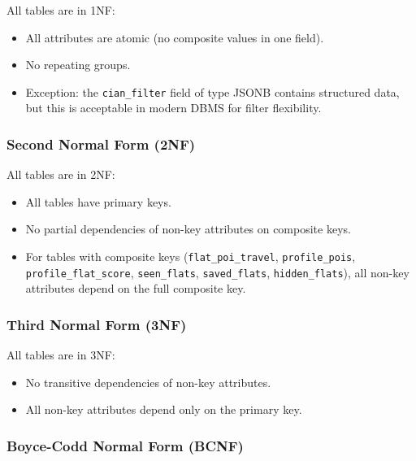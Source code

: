 \documentclass[12pt,a4paper]{article}
\begin{document}
All tables are in 1NF:
\begin{itemize}
    \item All attributes are atomic (no composite values in one field).
    \item No repeating groups.
    \item Exception: the \texttt{cian\_filter} field of type JSONB contains structured data, but this is acceptable in modern DBMS for filter flexibility.
\end{itemize}

\subsubsection{Second Normal Form (2NF)}

All tables are in 2NF:
\begin{itemize}
    \item All tables have primary keys.
    \item No partial dependencies of non-key attributes on composite keys.
    \item For tables with composite keys (\texttt{flat\_poi\_travel}, \texttt{profile\_pois}, \texttt{profile\_flat\_score}, \texttt{seen\_flats}, \texttt{saved\_flats}, \texttt{hidden\_flats}), all non-key attributes depend on the full composite key.
\end{itemize}

\subsubsection{Third Normal Form (3NF)}

All tables are in 3NF:
\begin{itemize}
    \item No transitive dependencies of non-key attributes.
    \item All non-key attributes depend only on the primary key.
\end{itemize}

\subsubsection{Boyce-Codd Normal Form (BCNF)}
\end{document}
